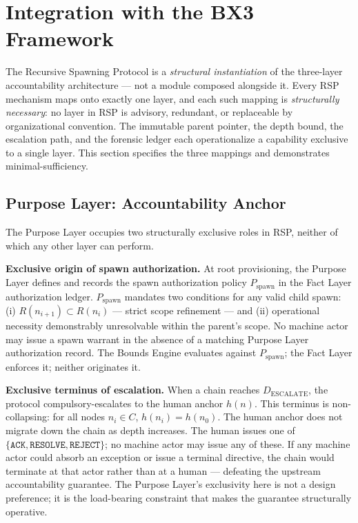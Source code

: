 \section{Integration with the BX3 Framework}
\label{sec:rs-integration}

The Recursive Spawning Protocol is a \emph{structural instantiation} of the \bxthree three-layer accountability architecture — not a module composed alongside it. Every RSP mechanism maps onto exactly one \bxthree layer, and each such mapping is \emph{structurally necessary}: no layer in RSP is advisory, redundant, or replaceable by organizational convention. The immutable parent pointer, the depth bound, the escalation path, and the forensic ledger each operationalize a capability exclusive to a single layer. This section specifies the three mappings and demonstrates minimal-sufficiency.

\subsection{Purpose Layer: Accountability Anchor}
\label{sec:rs-purpose-anchor}

The Purpose Layer occupies two structurally exclusive roles in RSP, neither of which any other layer can perform.

\medskip
\noindent\textbf{Exclusive origin of spawn authorization.} At root provisioning, the Purpose Layer defines and records the spawn authorization policy $P_{\mathrm{spawn}}$ in the Fact Layer authorization ledger. $P_{\mathrm{spawn}}$ mandates two conditions for any valid child spawn: (i) $R(n_{i+1}) \subset R(n_i)$ — strict scope refinement — and (ii) operational necessity demonstrably unresolvable within the parent's scope. No machine actor may issue a spawn warrant in the absence of a matching Purpose Layer authorization record. The Bounds Engine evaluates against $P_{\mathrm{spawn}}$; the Fact Layer enforces it; neither originates it.

\medskip
\noindent\textbf{Exclusive terminus of escalation.} When a chain reaches $D_{\mathrm{ESCALATE}}$, the protocol compulsory-escalates to the human anchor $h(n)$. This terminus is non-collapsing: for all nodes $n_i \in C$, $h(n_i) = h(n_0)$. The human anchor does not migrate down the chain as depth increases. The human issues one of $\{\texttt{ACK}, \texttt{RESOLVE}, \texttt{REJECT}\}$; no machine actor may issue any of these. If any machine actor could absorb an exception or issue a terminal directive, the chain would terminate at that actor rather than at a human — defeating the upstream \bxthree accountability guarantee. The Purpose Layer's exclusivity here is not a design preference; it is the load-bearing constraint that makes the guarantee structurally operative.

